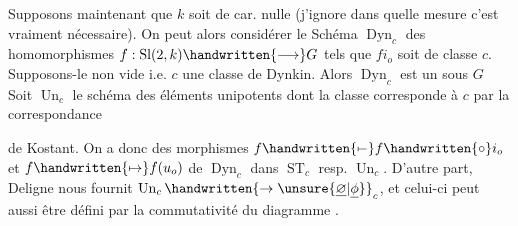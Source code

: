 Supposons maintenant que $k$ soit de car. nulle (j'ignore dans quelle mesure c'est vraiment nécessaire). On peut alors considérer le Schéma $\operatorname{Dyn}_c$ des homomorphismes $f:\operatorname{Sl}(2,k)\handwritten{\longrightarrow}G$ tels que $fi_o$ soit de classe $c$. Supposons-le non vide i.e. $c$ une classe de Dynkin. Alors $\operatorname{Dyn}_c$ est un  sous $G$ Soit $\operatorname{Un}_c$ le schéma des éléments unipotents dont la classe corresponde à  $c$ par la correspondance

de Kostant. On a donc des morphismes $f\handwritten{\mathrel{\mapstochar\relbar}}f\handwritten{\circ}i_o$ et $f\handwritten{\mapsto}f(u_o)$ de $\operatorname{Dyn}_c$ dans $\operatorname{ST}_c$ resp. $\operatorname{Un}_c$. D'autre part, Deligne nous fournit $\operatorname{Un}_c\handwritten{\to\unsure{\underline{\varnothing}|\underline{\phi}}}_c$, et celui-ci peut aussi être défini par la commutativité du diagramme 
.

